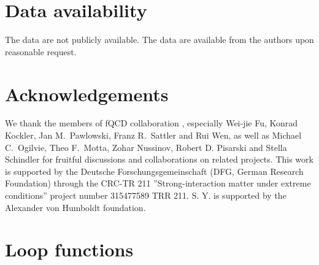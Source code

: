 \documentclass[reprint,english,superscriptaddress,preprintnumbers,amsmath,amssymb,aps,prd]{revtex4-2}
\begin{document}
\section{Data availability}
%
The data are not publicly available. The data are available from the authors upon reasonable request.
\vspace{1ex}
\section{Acknowledgements}
%
We thank the members of fQCD collaboration \cite{fQCD}, especially Wei-jie Fu, Konrad Kockler, Jan M.\ Pawlowski, Franz R.\ Sattler and Rui Wen, as well as Michael C.\ Ogilvie, Theo F.\ Motta, Zohar Nussinov, Robert D. Pisarski and Stella Schindler for fruitful discussions and collaborations on related projects. This work is supported by the Deutsche Forschungsgemeinschaft (DFG, German Research Foundation) through the CRC-TR 211 ''Strong-interaction matter under extreme conditions'' project number 315477589 TRR 211. S. Y. is supported by the Alexander von Humboldt foundation.

\appendix

\renewcommand{\thesection}{\Alph{section}}
\renewcommand{\theequation}{\Alph{section}\arabic{equation}}

\section{Loop functions}\label{app:loop}
\end{document}
